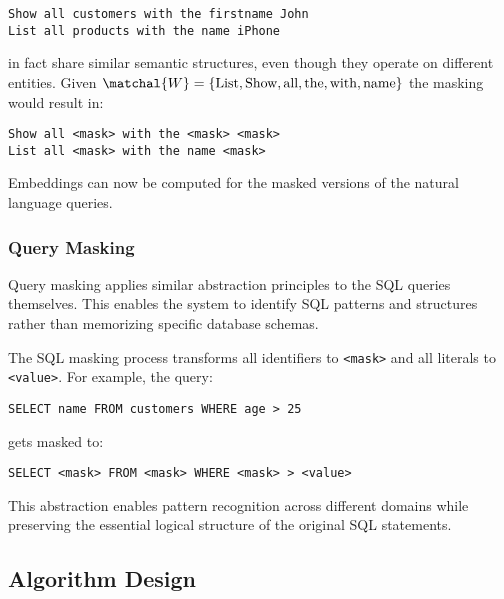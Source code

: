 \begin{verbatim}
Show all customers with the firstname John
List all products with the name iPhone
\end{verbatim}

in fact share similar semantic structures, even though they operate on different
entities. Given $\matchal{W} = \{\text{List}, \text{Show}, \text{all}, \text{the}, \text{with}, \text{name}\}$
the masking would result in:

\begin{verbatim}
Show all <mask> with the <mask> <mask>
List all <mask> with the name <mask>
\end{verbatim}

Embeddings can now be computed for the masked versions of the natural language queries.

\subsubsection{Query Masking}

Query masking applies similar abstraction principles to the SQL queries themselves.
This enables the system to identify SQL patterns and structures rather than
memorizing specific database schemas.

The SQL masking process transforms all identifiers to \texttt{<mask>} and all literals
to \texttt{<value>}. For example, the query:

\begin{verbatim}
SELECT name FROM customers WHERE age > 25
\end{verbatim}

gets masked to:

\begin{verbatim}
SELECT <mask> FROM <mask> WHERE <mask> > <value>
\end{verbatim}

This abstraction enables pattern recognition across different domains while
preserving the essential logical structure of the original SQL statements.









\subsection{Algorithm Design}

